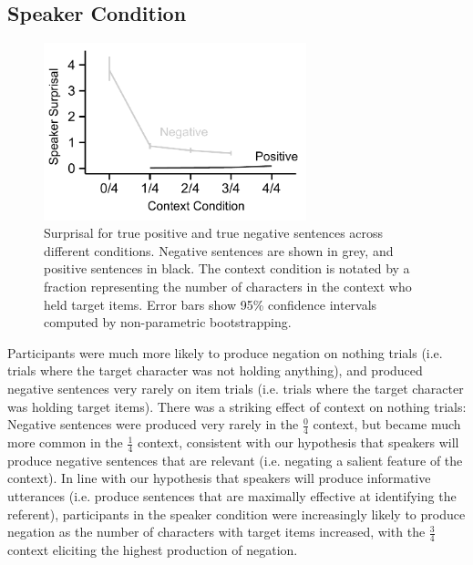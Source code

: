 \documentclass[man, noapacite]{apa2}
\begin{document}
\subsection{Speaker Condition}

\begin{figure}[t]
\begin{center} 
\includegraphics[width=3in]{figures/surprisals_mod.pdf}
\caption{\label{fig:speakersurprise} Surprisal for true positive and true negative sentences across different conditions. Negative sentences are shown in grey, and positive sentences in black.  The context condition is notated by a fraction representing the number of characters in the context who held target items. Error bars show 95\% confidence intervals computed by non-parametric bootstrapping.  }
\end{center} 
\end{figure}

Participants were much more likely to produce negation on nothing trials (i.e. trials where the target character was not holding anything), and produced negative sentences very rarely on item trials (i.e. trials where the target character was holding target items).   There was a striking effect of context on nothing trials: Negative sentences were produced very rarely in  the $\frac{0}{4}$ context, but became much more common in the $\frac{1}{4}$ context, consistent with our hypothesis that speakers will produce negative sentences that are relevant (i.e. negating a salient feature of the context).  In line with our hypothesis that speakers will produce informative utterances (i.e. produce sentences that are maximally effective at identifying the referent), participants in the speaker condition were increasingly likely to produce negation as the number of characters with target items increased, with the  $\frac{3}{4}$ context eliciting the highest production of negation.  
\end{document}
